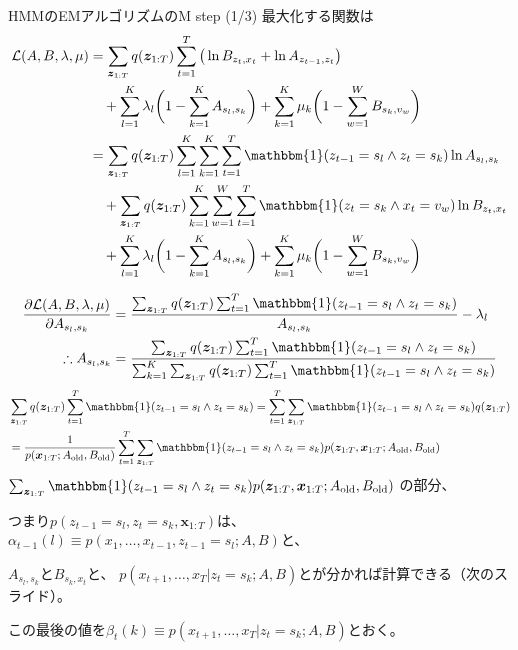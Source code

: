 \documentclass[aspectratio=169,unicode,dvipdfmx,14pt]{beamer}
\begin{document}
\begin{frame}{HMMのEMアルゴリズムのM step (1/3)}
\FontMath
最大化する関数は
\begin{align}
\mathcal{L}(A, B, \lambda, \mu)
& 
= \sum_{\bm{z}_{1:T}} q(\bm{z}_{1:T}) \sum_{t=1}^T \big( \ln B_{z_t,x_t} + \ln A_{z_{t-1},z_t} \big)
\notag \\ & \mbox{ \ \ }
+ \sum_{l=1}^K \lambda_l \bigg( 1 - \sum_{k=1}^K A_{s_l, s_k} \bigg)
+ \sum_{k=1}^K \mu_k \bigg( 1 - \sum_{w=1}^W B_{s_k, v_w} \bigg)
\notag \\ &
= 
\sum_{\bm{z}_{1:T}} q(\bm{z}_{1:T}) \sum_{l=1}^K \sum_{k=1}^K \sum_{t=1}^T 
\mathbbm{1}( z_{t-1} = s_l \wedge z_t = s_k ) \ln A_{s_l, s_k}
\notag \\ & \mbox{ \ \ }
+ \sum_{\bm{z}_{1:T}} q(\bm{z}_{1:T}) \sum_{k=1}^K \sum_{w=1}^W \sum_{t=1}^T 
\mathbbm{1}( z_t = s_k \wedge x_t = v_w ) \ln B_{z_t,x_t}
\notag \\ & \mbox{ \ \ }
+ \sum_{l=1}^K \lambda_l \bigg( 1 - \sum_{k=1}^K A_{s_l, s_k} \bigg)
+ \sum_{k=1}^K \mu_k \bigg( 1 - \sum_{w=1}^W B_{s_k, v_w} \bigg)
\end{align}
\end{frame}


\begin{frame}
\FontMath
\begin{align}
\frac{\partial \mathcal{L}(A, B, \lambda, \mu) }{\partial A_{s_l, s_k}}
& = \frac{ \sum_{\bm{z}_{1:T}} q(\bm{z}_{1:T}) \sum_{t=1}^T 
\mathbbm{1}( z_{t-1} = s_l \wedge z_t = s_k ) }{A_{s_l, s_k}}
- \lambda_l
\\
\therefore A_{s_l, s_k} & = \frac{ \sum_{\bm{z}_{1:T}} q(\bm{z}_{1:T}) \sum_{t=1}^T 
\mathbbm{1}( z_{t-1} = s_l \wedge z_t = s_k ) }
{ \sum_{k=1}^K \sum_{\bm{z}_{1:T}} q(\bm{z}_{1:T}) \sum_{t=1}^T \mathbbm{1}( z_{t-1} = s_l \wedge z_t = s_k ) }
\end{align}
\begin{align}
& \sum_{\bm{z}_{1:T}} q(\bm{z}_{1:T}) \sum_{t=1}^T 
\mathbbm{1}( z_{t-1} = s_l \wedge z_t = s_k )
=
\sum_{t=1}^T \sum_{\bm{z}_{1:T}}  
\mathbbm{1}( z_{t-1} = s_l \wedge z_t = s_k )q(\bm{z}_{1:T})
\notag \\ &
= 
\frac{1}{p(\bm{x}_{1:T}; A_{\mbox{\scriptsize old}}, B_{\mbox{\scriptsize old}})}
\sum_{t=1}^T \sum_{\bm{z}_{1:T}}  
\mathbbm{1}( z_{t-1} = s_l \wedge z_t = s_k ) 
p(\bm{z}_{1:T} , \bm{x}_{1:T}; A_{\mbox{\scriptsize old}}, B_{\mbox{\scriptsize old}})
\end{align}
$\sum_{\bm{z}_{1:T}}\mathbbm{1}( z_{t-1} = s_l \wedge z_t = s_k ) 
p(\bm{z}_{1:T} , \bm{x}_{1:T}; A_{\mbox{\scriptsize old}}, B_{\mbox{\scriptsize old}})$
の部分、

つまり$p(z_{t-1}=s_l, z_t=s_k, \bm{x}_{1:T})$は、
$\alpha_{t-1}(l) \equiv p(x_1,\ldots, x_{t-1}, z_{t-1}=s_l; A, B)$と、

$A_{s_l,s_k}$と$B_{s_k,x_t}$と、
$p(x_{t+1},\ldots,x_T|z_t=s_k;A,B)$とが分かれば計算できる（次のスライド）。

この最後の値を$\beta_t(k) \equiv p(x_{t+1},\ldots,x_T|z_t=s_k;A,B)$とおく。
\end{frame}
\end{document}
